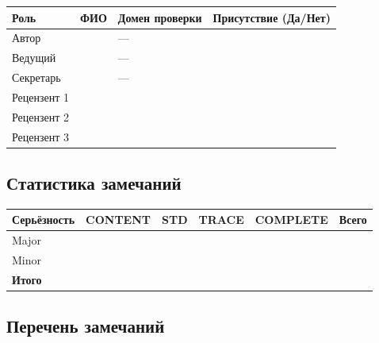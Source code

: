 \documentclass[12pt,a4paper]{article}
\begin{document}
\begin{table}[h!]
\centering
\begin{tabularx}{\textwidth}{
  >{\raggedright\arraybackslash}p{3.6cm}
  >{\raggedright\arraybackslash}X
  >{\raggedright\arraybackslash}p{4.2cm}
  >{\centering\arraybackslash}p{2.4cm}}
\toprule
\textbf{Роль} & \textbf{ФИО} & \textbf{Домен проверки} & \textbf{Присутствие (Да/Нет)} \\
\midrule
Автор & & --- & \\
\addlinespace
Ведущий & & --- & \\
\addlinespace
Секретарь & & --- & \\
\addlinespace
Рецензент 1 & & & \\
\addlinespace
Рецензент 2 & & & \\
\addlinespace
Рецензент 3 & & & \\
\bottomrule
\end{tabularx}
\end{table}

\subsection{Статистика замечаний}

\begin{table}[h!]
\centering
\begin{tabularx}{\textwidth}{|>{\raggedright\arraybackslash}p{2.8cm}|>{\centering\arraybackslash}X|>{\centering\arraybackslash}X|>{\centering\arraybackslash}X|>{\centering\arraybackslash}X|>{\centering\arraybackslash}p{1.8cm}|}
\hline
\textbf{Серьёзность} & \textbf{CONTENT} & \textbf{STD} & \textbf{TRACE} & \textbf{COMPLETE} & \textbf{Всего} \\
\hline
Major & & & & & \\
\hline
Minor & & & & & \\
\hline
\textbf{Итого} & & & & & \\
\hline
\end{tabularx}
\end{table}

\subsection{Перечень замечаний}
\end{document}
